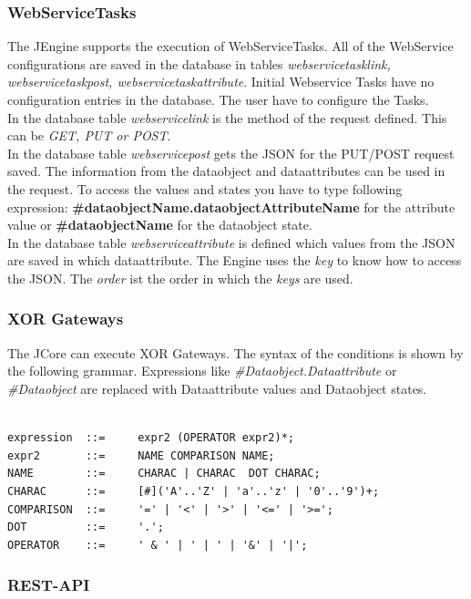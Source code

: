 \subsubsection{WebServiceTasks}
The JEngine supports the execution of WebServiceTasks. All of the WebService configurations are saved in the database in tables \textit{webservicetasklink, webservicetaskpost, webservicetaskattribute}. Initial Webservice Tasks have no configuration entries in the database. The user have to configure the Tasks.\\
In the database table \textit{webservicelink} is the method of the request defined. This can be \textit{GET, PUT or POST}.\\
In the database table \textit{webservicepost} gets the JSON for the PUT/POST request saved. The information from the dataobject and dataattributes can be used in the request. To access the values and states you have to type following expression:
\textbf{\#dataobjectName.dataobjectAttributeName} \nonumber for the attribute value or
\textbf{\#dataobjectName} \nonumber for the dataobject state.\\
In the database table \textit{webserviceattribute} is defined which values from the JSON are saved in which dataattribute. The Engine uses the \textit{key} to know how to access the JSON. The \textit{order} ist the order in which the \textit{keys} are used.
%
%

\subsubsection{XOR Gateways}

The JCore can execute XOR Gateways. The syntax of the conditions is shown by the following grammar. Expressions like \textit{#Dataobject.Dataattribute} or \textit{#Dataobject} are replaced with Dataattribute values and Dataobject states.\\
\begin{lstlisting}

expression  ::=     expr2 (OPERATOR expr2)*;
expr2       ::=     NAME COMPARISON NAME;
NAME        ::=     CHARAC | CHARAC  DOT CHARAC;
CHARAC      ::=     [#]('A'..'Z' | 'a'..'z' | '0'..'9')+;
COMPARISON  ::=     '=' | '<' | '>' | '<=' | '>=';
DOT         ::=     '.';
OPERATOR    ::=     ' & ' | ' | ' | '&' | '|';

\end{lstlisting}

\subsubsection{REST-API}

